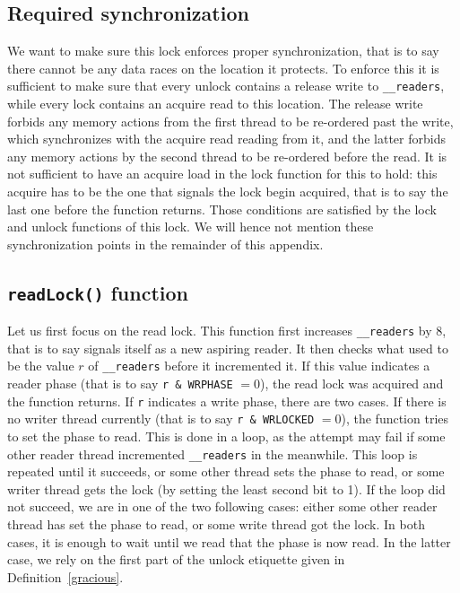 		\subsection{Required synchronization}
		\label{synchGlib}
We want to make sure this lock enforces proper synchronization, that is to say there cannot be any data races on the location it protects. To enforce this it is sufficient to make sure that every unlock contains a release write to \texttt{\_\_readers}, while every lock contains an acquire read to this location. The release write forbids any memory actions from the first thread to be re-ordered past the write, which synchronizes with the acquire read reading from it, and the latter forbids any memory actions by the second thread to be re-ordered before the read. It is not sufficient to have an acquire load in the lock function for this to hold: this acquire has to be the one that signals the lock begin acquired, that is to say the last one before the function returns. Those conditions are satisfied by the lock and unlock functions of this lock. We will hence not mention these synchronization points in the remainder of this appendix.

		\subsection{\texttt{readLock()} function}

		Let us first focus on the read lock. This function first increases \texttt{\_\_readers} by 8, that is to say signals itself as a new aspiring reader. It then checks what used to be the value $r$ of \texttt{\_\_readers} before it incremented it. If this value indicates a reader phase (that is to say \texttt{r \& WRPHASE} $ = 0$), the read lock was acquired and the function returns. If \texttt{r} indicates a write phase, there are two cases. If there is no writer thread currently (that is to say \texttt{r \& WRLOCKED} $= 0$), the function tries to set the phase to read. This is done in a loop, as the attempt may fail if some other reader thread incremented \texttt{\_\_readers} in the meanwhile. This loop is repeated until it succeeds, or some other thread sets the phase to read, or some writer thread gets the lock (by setting the least second bit to 1). If the loop did not succeed, we are in one of the two following cases: either some other reader thread has set the phase to read, or some write thread got the lock. In both cases, it is enough to wait until we read that the phase is now read. In the latter case, we rely on the first part of the unlock etiquette given in Definition~\ref{gracious}.

